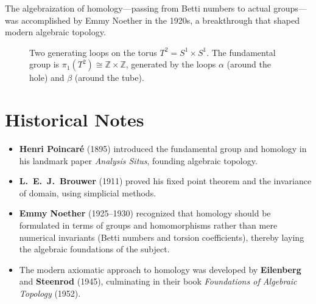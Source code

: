 \documentclass[11pt,a4paper,twoside]{book}
\theoremstyle{remark}
\theoremstyle{definition}
\theoremstyle{definition}
\begin{document}
The algebraization of homology---passing from Betti numbers to actual
groups---was accomplished by Emmy Noether in the
1920s, a breakthrough that shaped modern algebraic topology.

\begin{figure}[ht]
\centering
{}
\caption{Two generating loops on the torus $T^2 = S^1\times S^1$.  The
fundamental group is $\pi_1(T^2)\cong\mathbb{Z}\times\mathbb{Z}$,
generated by the loops $\alpha$ (around the hole) and $\beta$ (around
the tube).}
\label{fig:torus-loops}
\end{figure}

\section{Historical Notes}
\label{sec:algebraic-topology-history}

\begin{itemize}
  \item \textbf{Henri Poincar\'{e}} (1895)
        introduced the fundamental group and homology in his landmark
        paper \emph{Analysis Situs}, founding algebraic topology.
  \item \textbf{L.~E.~J.\ Brouwer} (1911)
        proved his fixed point theorem and the invariance of domain,
        using simplicial methods.
  \item \textbf{Emmy Noether} (1925--1930)
        recognized that homology should be formulated in terms of
        groups and homomorphisms rather than mere numerical invariants
        (Betti numbers and torsion coefficients), thereby laying the
        algebraic foundations of the subject.
  \item The modern axiomatic approach to homology was developed by
        \textbf{Eilenberg} and \textbf{Steenrod}
        (1945), culminating in their book \emph{Foundations of Algebraic
        Topology} (1952).
\end{itemize}
\end{document}
